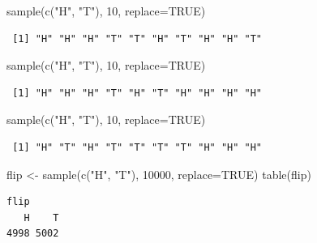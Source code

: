 \documentclass[
  letterpaper,
  DIV=11,
  numbers=noendperiod]{scrreprt}
\newenvironment{Shaded}{\begin{snugshade}}{\end{snugshade}}
\newcommand{\AttributeTok}[1]{\textcolor[rgb]{0.40,0.45,0.13}{#1}}
\newcommand{\ConstantTok}[1]{\textcolor[rgb]{0.56,0.35,0.01}{#1}}
\newcommand{\DecValTok}[1]{\textcolor[rgb]{0.68,0.00,0.00}{#1}}
\newcommand{\FunctionTok}[1]{\textcolor[rgb]{0.28,0.35,0.67}{#1}}
\newcommand{\NormalTok}[1]{\textcolor[rgb]{0.00,0.23,0.31}{#1}}
\newcommand{\OtherTok}[1]{\textcolor[rgb]{0.00,0.23,0.31}{#1}}
\newcommand{\StringTok}[1]{\textcolor[rgb]{0.13,0.47,0.30}{#1}}
\begin{document}
\begin{Shaded}
\begin{Highlighting}[]
\FunctionTok{sample}\NormalTok{(}\FunctionTok{c}\NormalTok{(}\StringTok{"H"}\NormalTok{, }\StringTok{"T"}\NormalTok{), }\DecValTok{10}\NormalTok{, }\AttributeTok{replace=}\ConstantTok{TRUE}\NormalTok{)}
\end{Highlighting}
\end{Shaded}

\begin{verbatim}
 [1] "H" "H" "H" "T" "T" "H" "T" "H" "H" "T"
\end{verbatim}

\begin{Shaded}
\begin{Highlighting}[]
\FunctionTok{sample}\NormalTok{(}\FunctionTok{c}\NormalTok{(}\StringTok{"H"}\NormalTok{, }\StringTok{"T"}\NormalTok{), }\DecValTok{10}\NormalTok{, }\AttributeTok{replace=}\ConstantTok{TRUE}\NormalTok{)}
\end{Highlighting}
\end{Shaded}

\begin{verbatim}
 [1] "H" "H" "H" "T" "H" "T" "H" "H" "H" "H"
\end{verbatim}

\begin{Shaded}
\begin{Highlighting}[]
\FunctionTok{sample}\NormalTok{(}\FunctionTok{c}\NormalTok{(}\StringTok{"H"}\NormalTok{, }\StringTok{"T"}\NormalTok{), }\DecValTok{10}\NormalTok{, }\AttributeTok{replace=}\ConstantTok{TRUE}\NormalTok{)}
\end{Highlighting}
\end{Shaded}

\begin{verbatim}
 [1] "H" "T" "H" "T" "T" "T" "T" "H" "H" "H"
\end{verbatim}

\begin{Shaded}
\begin{Highlighting}[]
\NormalTok{flip }\OtherTok{\textless{}{-}} \FunctionTok{sample}\NormalTok{(}\FunctionTok{c}\NormalTok{(}\StringTok{"H"}\NormalTok{, }\StringTok{"T"}\NormalTok{), }\DecValTok{10000}\NormalTok{, }\AttributeTok{replace=}\ConstantTok{TRUE}\NormalTok{)}
\FunctionTok{table}\NormalTok{(flip)}
\end{Highlighting}
\end{Shaded}

\begin{verbatim}
flip
   H    T 
4998 5002 
\end{verbatim}
\end{document}
